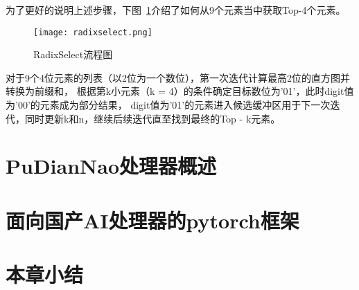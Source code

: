 为了更好的说明上述步骤，下图~\ref{fig:radixselect}介绍了如何从9个元素当中获取Top-4个元素。

\begin{figure}[ht]
    \centering
    \texttt{[image: radixselect.png]}
    \caption{RadixSelect流程图}
    \label{fig:radixselect}
\end{figure}

对于9个4位元素的列表（以2位为一个数位），第一次迭代计算最高2位的直方图并转换为前缀和，
根据第k小元素（k = 4）的条件确定目标数位为'01'，此时digit值为'00'的元素成为部分结果，
digit值为'01'的元素进入候选缓冲区用于下一次迭代，同时更新k和n，继续后续迭代直至找到最终的Top - k元素。





\section{PuDianNao处理器概述}


\section{面向国产AI处理器的pytorch框架}


\section{本章小结}
